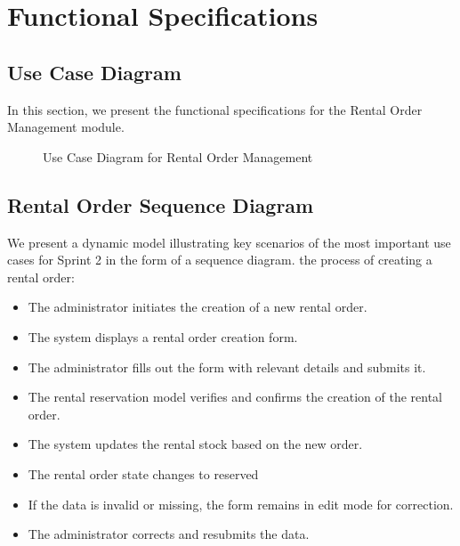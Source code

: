\section{Functional Specifications}

\subsection{Use Case Diagram}
In this section, we present the functional specifications for the Rental Order Management module.
\newpage
\begin{figure}[h]
    \centering
    \caption{Use Case Diagram for Rental Order Management}
    \label{fig:sprint2_use_case_diagram}
\end{figure}

\subsection{Rental Order Sequence Diagram}
We present a dynamic model illustrating key scenarios of the most important use cases for Sprint 2 in the form of a sequence diagram. the process of creating a rental order:

\begin{itemize}
    \item The administrator initiates the creation of a new rental order.
    \item The system displays a rental order creation form.
    \item The administrator fills out the form with relevant details and submits it.
    \item The rental reservation model verifies and confirms the creation of the rental order.
    \item The system updates the rental stock based on the new order.
    \item The rental order state changes to reserved
    \item If the data is invalid or missing, the form remains in edit mode for correction.
    \item The administrator corrects and resubmits the data.
\end{itemize}


